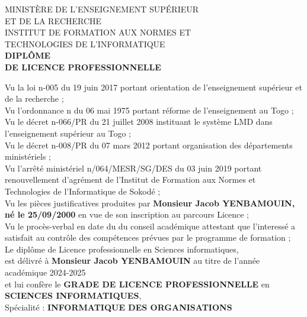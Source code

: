 \documentclass[a4paper, landscape, 10pt]{article}
\date{}
\title{}
\newcommand\BackgroundPic{
\put(-4,0){
\parbox[b][\paperheight]{\paperwidth}{
\texttt{[image: fond\_diplome\_haut]}
}}}
\begin{document}
\AddToShipoutPicture*{\BackgroundPic}
\maketitle
\vspace{-4.5cm}

\begin{center}
\large
MINISTÈRE DE L'ENSEIGNEMENT SUPÉRIEUR\\
ET DE LA RECHERCHE\\
\vspace{0.5cm}
INSTITUT DE FORMATION AUX NORMES ET\\
TECHNOLOGIES DE L'INFORMATIQUE\\
\vspace{0.5cm}
\LARGE
\textbf{DIPLÔME\\
DE LICENCE PROFESSIONNELLE}\\
\end{center}
\vspace{0.5cm}
\noindent
Vu la loi n-005 du 19 juin 2017 portant orientation de l’enseignement supérieur et de la recherche ;\\
Vu l’ordonnance n du 06 mai 1975 portant réforme de l’enseignement au Togo ;\\
Vu le décret n-066/PR du 21 juillet 2008 instituant le système LMD dans l’enseignement supérieur au Togo ;\\
Vu le décret n-008/PR du 07 mars 2012 portant organisation des départements ministériels ;\\
Vu l'arrêté ministériel n/064/MESR/SG/DES du 03 juin 2019 portant renouvellement d'agrément de l'Institut de Formation aux Normes et Technologies de l’Informatique de Sokodé ;\\
Vu les pièces justificatives produites par \textbf{Monsieur Jacob YENBAMOUIN, né le 25/09/2000} en vue de son inscription au parcours Licence ;\\
Vu le procès-verbal en date du  \hspace{0.15cm}du conseil académique attestant que l'interessé a satisfait au contrôle des compétences prévues par le programme de formation ;\\

\noindent
Le diplôme de Licence professionnelle en Sciences informatiques,\\
est délivré à \textbf{Monsieur Jacob YENBAMOUIN} au titre de l'année académique 2024-2025\\
et lui confère le \textbf{GRADE DE LICENCE PROFESSIONNELLE} en \textbf{SCIENCES INFORMATIQUES},\\
Spécialité : \textbf{INFORMATIQUE DES ORGANISATIONS}\\
\end{document}
